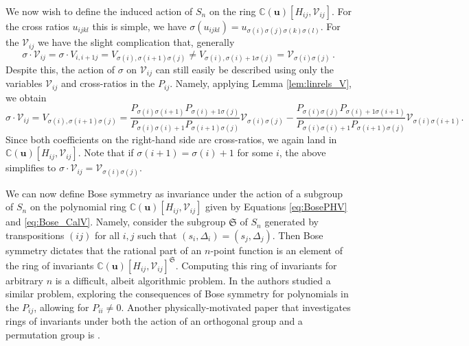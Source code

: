 \documentclass[12pt,a4paper]{extarticle}
\theoremstyle{definition}
\begin{document}
We now wish to define the induced action of $S_n$ on the ring $\mathbb{C}(\mathbf{u})[H_{ij},\mathcal{V}_{ij}]$. For the cross ratios $u_{ijkl}$ this is simple, we have $\sigma(u_{ijkl})=u_{\sigma(i)\sigma(j)\sigma(k)\sigma(l)}$. For the $\mathcal{V}_{ij}$ we have the slight complication that, generally
\begin{equation}
    \sigma\cdot \mathcal{V}_{ij}=\sigma\cdot V_{i,i+1 j}=V_{\sigma(i), \sigma(i+1)\sigma(j)}\neq V_{\sigma(i), \sigma(i)+1\sigma(j)}=\mathcal{V}_{\sigma(i)\sigma(j)}\,.
\end{equation} 
Despite this, the action of $\sigma$ on $\mathcal{V}_{ij}$ can still easily be described using only the variables $\mathcal{V}_{ij}$ and cross-ratios in the $P_{ij}$. Namely, applying Lemma \ref{lem:linrels_V}, we obtain
\begin{equation}\label{eq:Bose_CalV}
    \sigma\cdot \mathcal{V}_{ij} = V_{\sigma(i), \sigma(i+1)\sigma(j)} =\dfrac{P_{\sigma(i)\sigma(i+1)}P_{\sigma(i)+1\sigma(j)}}{P_{\sigma(i)\sigma(i)+1}P_{\sigma(i+1)\sigma(j)}}\mathcal{V}_{\sigma(i)\sigma(j)} - \dfrac{P_{\sigma(i)\sigma(j)}P_{\sigma(i)+1\sigma(i+1)}}{P_{\sigma(i)\sigma(i)+1}P_{\sigma(i+1)\sigma(j)}}\mathcal{V}_{\sigma(i)\sigma(i+1)}.
\end{equation}
Since both coefficients on the right-hand side are cross-ratios, we again land in $\mathbb{C}(\mathbf{u})[H_{ij}, \mathcal{V}_{ij}]$.
Note that if $\sigma(i+1)=\sigma(i)+1$ for some $i$, the above simplifies to $\sigma\cdot \mathcal{V}_{ij}=\mathcal{V}_{\sigma(i)\sigma(j)}$.

\medskip

We can now define Bose symmetry as invariance under the action of a subgroup of $S_n$ on the polynomial ring $\mathbb{C}(\mathbf{u})[H_{ij}, \mathcal{V}_{ij}]$ given by Equations \eqref{eq:BosePHV} and \eqref{eq:Bose_CalV}. 
Namely, consider the subgroup $\mathfrak S$ of $S_n$ generated by transpositions $(ij)$ for all $i,j$ such that $(s_i,\Delta_i)=(s_j, \Delta_j)$. Then Bose symmetry dictates that the rational part of an $n$-point function is an element of the ring of invariants
$\mathbb{C}(\mathbf{u})[H_{ij}, \mathcal{V}_{ij}]^\mathfrak{S}$. 
Computing this ring of invariants for arbitrary $n$ is a difficult, albeit algorithmic \cite{Derksen} problem. 
In \cite{GHL} the authors studied a similar problem, exploring the consequences of Bose symmetry for polynomials in the $P_{ij}$, allowing for $P_{ii}\neq0$. Another physically-motivated paper that investigates rings of invariants under both the action of an orthogonal group and a permutation group is \cite{HLMM}.
\end{document}
